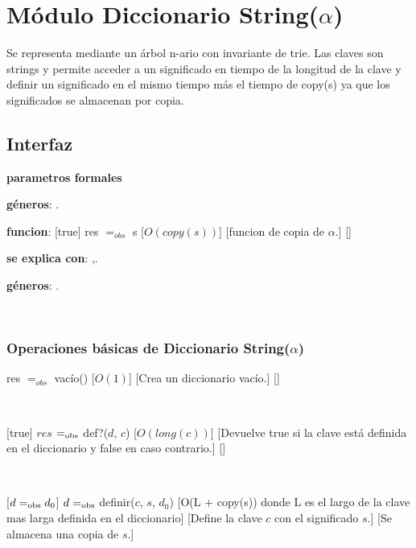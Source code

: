 \section{Módulo Diccionario String($\alpha$)}

Se representa mediante un árbol n-ario con invariante de trie. Las claves son strings y permite acceder a un significado en tiempo de la longitud de la clave y definir un significado en el mismo tiempo más el tiempo de copy(s) ya que los significados se almacenan por copia.

\subsection{Interfaz}

\textbf{parametros formales}

\textbf{géneros}: \TipoVariable{$\alpha$}.

\textbf{funcion}: 
				  [true]
				  {res $=_{obs}$ s}
				  [$O(copy(s))$]
				  [funcion de copia de $\alpha$.]
				  []

\textbf{se explica con}: ,.

\textbf{géneros}: .



~

\subsubsection{Operaciones básicas de Diccionario String($\alpha$)}

{res $=_{obs}$ vacío()}
[$O(1)$]
[Crea un diccionario vacío.]
[]

~



[true]
{$res$ $=_{\mathrm{obs}}$ def?($d$, $c$)}
[$O(long(c))$]
[Devuelve true si la clave está definida en el diccionario y false en caso contrario.]
[]

~

[$ d =_{\mathrm{obs}} d_0 $]
{$ d =_{\mathrm{obs}}$ definir($c$, $s$, $d_0$)}
[O(L + copy(s)) donde L es el largo de la clave mas larga definida en el diccionario]
[Define la clave $c$ con el significado $s$.]
[Se almacena una copia de $s$.]

